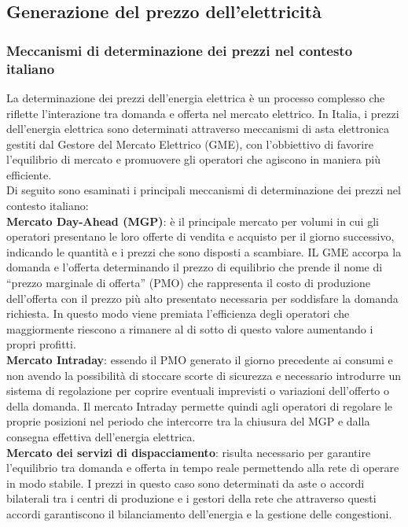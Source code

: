 \documentclass{article}
\begin{document}
\subsection{Generazione del prezzo dell'elettricità}
\subsubsection{Meccanismi di determinazione dei prezzi nel contesto italiano}
La determinazione dei prezzi dell'energia elettrica è un processo complesso che riflette l'interazione tra domanda e offerta nel mercato elettrico. In Italia, i prezzi dell'energia elettrica sono determinati attraverso meccanismi di asta elettronica gestiti dal Gestore del Mercato Elettrico (GME), con l’obbiettivo di favorire l’equilibrio di mercato e promuovere gli operatori che agiscono in maniera più efficiente.\\
Di seguito sono esaminati i principali meccanismi di determinazione dei prezzi nel contesto italiano:\cite{GME2023}\cite{GME_Sito}\\
\textbf{Mercato Day-Ahead (MGP)}: è il principale mercato per volumi in cui gli operatori presentano le loro offerte di vendita e acquisto per il giorno successivo, indicando le quantità e i prezzi che sono disposti a scambiare. IL GME accorpa la domanda e l’offerta determinando il prezzo di equilibrio che prende il nome di “prezzo marginale di offerta” (PMO) che rappresenta il costo di produzione dell’offerta con il prezzo più alto presentato necessaria per soddisfare la domanda richiesta. In questo modo viene premiata l’efficienza degli operatori che maggiormente riescono a rimanere al di sotto di questo valore aumentando i propri profitti.\\
\textbf{Mercato Intraday}: essendo il PMO generato il giorno precedente ai consumi e non avendo la possibilità di stoccare scorte di sicurezza e necessario introdurre un sistema di regolazione per coprire eventuali imprevisti o variazioni dell’offerto o della domanda. Il mercato Intraday permette quindi agli operatori di regolare le proprie posizioni nel periodo che intercorre tra la chiusura del MGP e dalla consegna effettiva dell’energia elettrica.\\
\textbf{Mercato dei servizi di dispacciamento}: risulta necessario per garantire l’equilibrio tra domanda e offerta in tempo reale permettendo alla rete di operare in modo stabile. I prezzi in questo caso sono determinati da aste o accordi bilaterali tra i centri di produzione e i gestori della rete che attraverso questi accordi garantiscono il bilanciamento dell’energia e la gestione delle congestioni.\\
\end{document}
